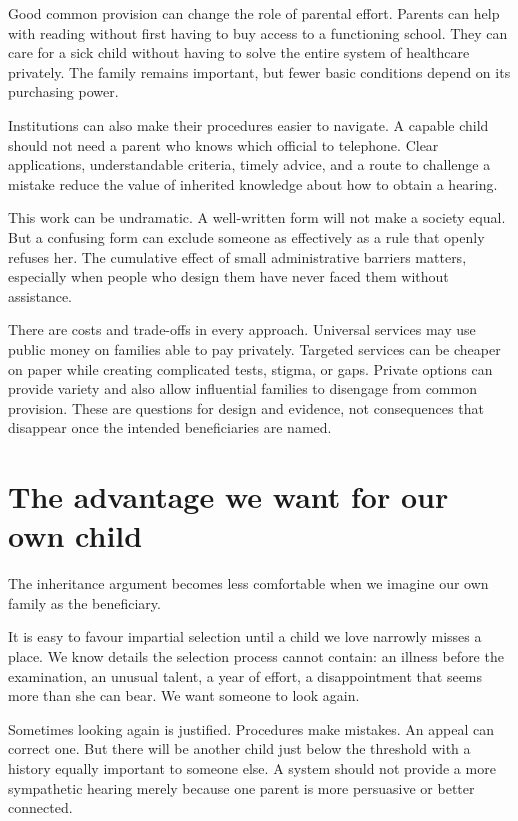 \documentclass[12pt,a4paper]{book}
\begin{document}
Good common provision can change the role of parental effort. Parents can help with reading without first having to buy access to a functioning school. They can care for a sick child without having to solve the entire system of healthcare privately. The family remains important, but fewer basic conditions depend on its purchasing power.

Institutions can also make their procedures easier to navigate. A capable child should not need a parent who knows which official to telephone. Clear applications, understandable criteria, timely advice, and a route to challenge a mistake reduce the value of inherited knowledge about how to obtain a hearing.

This work can be undramatic. A well-written form will not make a society equal. But a confusing form can exclude someone as effectively as a rule that openly refuses her. The cumulative effect of small administrative barriers matters, especially when people who design them have never faced them without assistance.

There are costs and trade-offs in every approach. Universal services may use public money on families able to pay privately. Targeted services can be cheaper on paper while creating complicated tests, stigma, or gaps. Private options can provide variety and also allow influential families to disengage from common provision. These are questions for design and evidence, not consequences that disappear once the intended beneficiaries are named.

\section*{The advantage we want for our own child}

The inheritance argument becomes less comfortable when we imagine our own family as the beneficiary.

It is easy to favour impartial selection until a child we love narrowly misses a place. We know details the selection process cannot contain: an illness before the examination, an unusual talent, a year of effort, a disappointment that seems more than she can bear. We want someone to look again.

Sometimes looking again is justified. Procedures make mistakes. An appeal can correct one. But there will be another child just below the threshold with a history equally important to someone else. A system should not provide a more sympathetic hearing merely because one parent is more persuasive or better connected.
\end{document}
